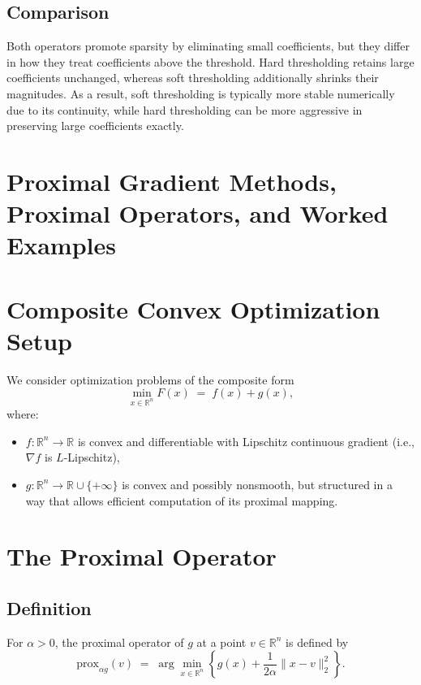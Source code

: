 \documentclass[11pt]{article}
\begin{document}
\subsection{Comparison}

Both operators promote sparsity by eliminating small coefficients, but they differ in how they treat coefficients above the threshold. Hard thresholding retains large coefficients unchanged, whereas soft thresholding additionally shrinks their magnitudes. As a result, soft thresholding is typically more stable numerically due to its continuity, while hard thresholding can be more aggressive in preserving large coefficients exactly.

\section{Proximal Gradient Methods, Proximal Operators, and Worked Examples}

\section{Composite Convex Optimization Setup}

We consider optimization problems of the composite form
\begin{equation}
\min_{x \in \mathbb{R}^n} F(x) \;=\; f(x) + g(x),
\end{equation}
where:
\begin{itemize}
  \item $f:\mathbb{R}^n \to \mathbb{R}$ is convex and differentiable with Lipschitz continuous gradient (i.e., $\nabla f$ is $L$-Lipschitz),
  \item $g:\mathbb{R}^n \to \mathbb{R}\cup\{+\infty\}$ is convex and possibly nonsmooth, but structured in a way that allows efficient computation of its proximal mapping.
\end{itemize}

\section{The Proximal Operator}

\subsection{Definition}

For $\alpha>0$, the proximal operator of $g$ at a point $v \in \mathbb{R}^n$ is defined by
\begin{equation}
\mathrm{prox}_{\alpha g}(v)
\;=\;
\arg\min_{x \in \mathbb{R}^n}
\left\{
g(x) + \frac{1}{2\alpha}\|x - v\|_2^2
\right\}.
\end{equation}
\end{document}
